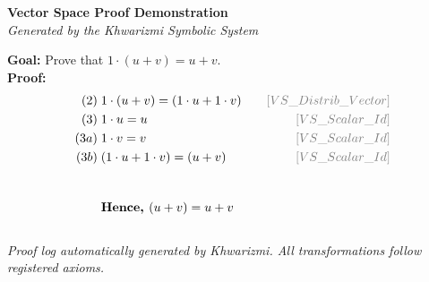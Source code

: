\documentclass[12pt]{article}
\begin{document}
\begin{center}
\Large\textbf{Vector Space Proof Demonstration}\\[0.5em]
\normalsize\textit{Generated by the Khwarizmi Symbolic System}\\[1em]
\end{center}
\textbf{Goal:} Prove that $1·(u+v)=u+v$.
\\[1em]
\textbf{Proof:}
\\[0.5em]
\begin{alignat*}{3}
(2)\;& 1 \cdot (u + v) = (1 \cdot u + 1 \cdot v) & \quad\textcolor{gray}{[VS\_Distrib\_Vector]} \\
(3)\;& 1 \cdot u = u & \quad\textcolor{gray}{[VS\_Scalar\_Id]} \\
(3a)\;& 1 \cdot v = v & \quad\textcolor{gray}{[VS\_Scalar\_Id]} \\
(3b)\;& (1 \cdot u + 1 \cdot v) = (u + v) & \quad\textcolor{gray}{[VS\_Scalar\_Id]} \\
\\[1em]
&\textbf{Hence, } (u + v) = u+v\\[1em]
\end{alignat*}
\vfill
\begin{center}
\small\textit{Proof log automatically generated by Khwarizmi. All transformations follow registered axioms.}
\end{center}
\end{document}
